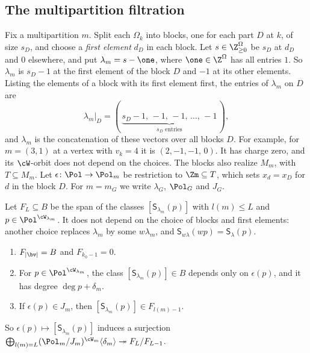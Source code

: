 \documentclass[11pt]{amsart}
\begin{document}
\subsection{The multipartition filtration}\label{ss:filt}
Fix a multipartition $m$.  Split each $\Omega_k$ into blocks, one for each
part $D$ at $k$, of size $s_D$, and choose a \emph{first element} $d_D$ in
each block.  Let $s\in\Z^\Omega_{\ge0}$ be $s_D$ at $d_D$ and $0$ elsewhere,
and put $\lambda_m=s-\one$, where $\one\in\Z^\Omega$ has all entries $1$.  So
$\lambda_m$ is $s_D-1$ at the first element of
the block $D$ and $-1$ at its other elements.  Listing the elements of a
block with its first element first, the entries of $\lambda_m$ on $D$ are
\[
 \lambda_m|_D=(\,\underbrace{s_D-1,\,-1,\,-1,\,\dots,\,-1}_{s_D\text{ entries}}\,),
\]
and $\lambda_m$ is the concatenation of these vectors over all blocks $D$.  For
example, for $m=(3,1)$ at a vertex with $v_k=4$ it is $(2,-1,-1,\,0)$.  It has
charge zero, and its
$\cW$-orbit does not depend on the choices.  The blocks also realize $M_m$,
with $T\subseteq M_m$.  Let $\epsilon\colon \Pol\to \Pol_m$ be restriction to
$\Zm\subseteq T$, which sets $x_d=x_D$ for $d$ in the block $D$.  For
$m=m_G$ we write $\lambda_G$, $\Pol_G$ and $J_G$.

Let $F_L\subseteq B$ be the span of the classes $[\mathsf S_{\lambda_m}(p)]$
with $l(m)\le L$ and $p\in \Pol^{\cW_{\lambda_m}}$.  It does not depend on the
choice of blocks and first elements: another choice replaces $\lambda_m$ by
some $w\lambda_m$, and $\mathsf S_{w\lambda}(wp)=\mathsf S_\lambda(p)$.

\begin{proposition}\label{prop:filt}
\begin{enumerate}[leftmargin=2em]
\item $F_{|\bv|}=B$ and $F_{k_0-1}=0$.
\item For $p\in\Pol^{\cW_{\lambda_m}}$, the class $[\mathsf S_{\lambda_m}(p)]\in B$
depends only on $\epsilon(p)$, and it has degree $\deg p+\delta_m$.
\item If $\epsilon(p)\in J_m$, then $[\mathsf S_{\lambda_m}(p)]\in
F_{l(m)-1}$.
\end{enumerate}
So $\epsilon(p)\mapsto[\mathsf S_{\lambda_m}(p)]$ induces a surjection
$\bigoplus_{l(m)=L}(\Pol_m/J_m)^{\cW_m}\langle\delta_m\rangle\twoheadrightarrow
F_L/F_{L-1}$.
\end{proposition}
\end{document}
